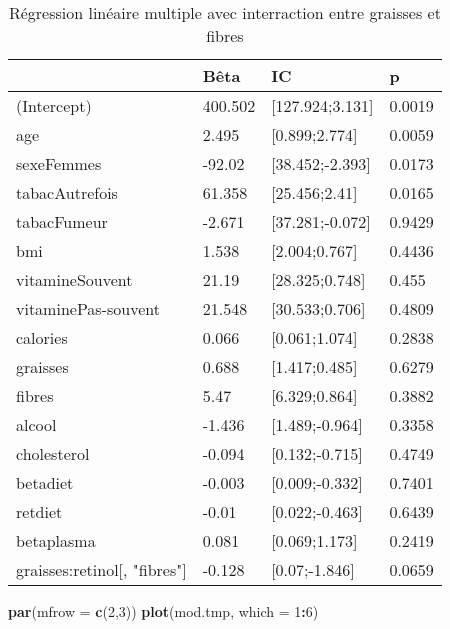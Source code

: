 \documentclass[]{article}
\newenvironment{Shaded}{\begin{snugshade}}{\end{snugshade}}
\newcommand{\KeywordTok}[1]{\textcolor[rgb]{0.13,0.29,0.53}{\textbf{#1}}}
\newcommand{\DataTypeTok}[1]{\textcolor[rgb]{0.13,0.29,0.53}{#1}}
\newcommand{\DecValTok}[1]{\textcolor[rgb]{0.00,0.00,0.81}{#1}}
\newcommand{\OperatorTok}[1]{\textcolor[rgb]{0.81,0.36,0.00}{\textbf{#1}}}
\newcommand{\NormalTok}[1]{#1}
\begin{document}
\begin{table}

\caption{\label{tab:unnamed-chunk-75}Régression linéaire multiple avec interraction entre graisses et fibres}
\centering
\begin{tabular}[t]{l|l|l|l}
\hline
  & Bêta & IC & p\\
\hline
\rowcolor[HTML]{BBD2E1}  (Intercept) & 400.502 & [127.924;3.131] & 0.0019\\
\hline
age & 2.495 & [0.899;2.774] & 0.0059\\
\hline
\rowcolor[HTML]{BBD2E1}  sexeFemmes & -92.02 & [38.452;-2.393] & 0.0173\\
\hline
tabacAutrefois & 61.358 & [25.456;2.41] & 0.0165\\
\hline
\rowcolor[HTML]{BBD2E1}  tabacFumeur & -2.671 & [37.281;-0.072] & 0.9429\\
\hline
bmi & 1.538 & [2.004;0.767] & 0.4436\\
\hline
\rowcolor[HTML]{BBD2E1}  vitamineSouvent & 21.19 & [28.325;0.748] & 0.455\\
\hline
vitaminePas-souvent & 21.548 & [30.533;0.706] & 0.4809\\
\hline
\rowcolor[HTML]{BBD2E1}  calories & 0.066 & [0.061;1.074] & 0.2838\\
\hline
graisses & 0.688 & [1.417;0.485] & 0.6279\\
\hline
\rowcolor[HTML]{BBD2E1}  fibres & 5.47 & [6.329;0.864] & 0.3882\\
\hline
alcool & -1.436 & [1.489;-0.964] & 0.3358\\
\hline
\rowcolor[HTML]{BBD2E1}  cholesterol & -0.094 & [0.132;-0.715] & 0.4749\\
\hline
betadiet & -0.003 & [0.009;-0.332] & 0.7401\\
\hline
\rowcolor[HTML]{BBD2E1}  retdiet & -0.01 & [0.022;-0.463] & 0.6439\\
\hline
betaplasma & 0.081 & [0.069;1.173] & 0.2419\\
\hline
\rowcolor[HTML]{BBD2E1}  graisses:retinol[, "fibres"] & -0.128 & [0.07;-1.846] & 0.0659\\
\hline
\end{tabular}
\end{table}

\begin{Shaded}
\begin{Highlighting}[]
\KeywordTok{par}\NormalTok{(}\DataTypeTok{mfrow =} \KeywordTok{c}\NormalTok{(}\DecValTok{2}\NormalTok{,}\DecValTok{3}\NormalTok{))}
\KeywordTok{plot}\NormalTok{(mod.tmp, }\DataTypeTok{which =} \DecValTok{1}\OperatorTok{:}\DecValTok{6}\NormalTok{)}
\end{Highlighting}
\end{Shaded}
\end{document}
